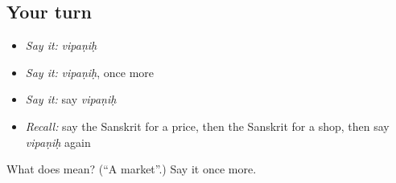 \subsection*{Your turn}
\begin{itemize}
\raggedright
  \item \emph{Say it:} \emph{vipaṇiḥ}
  \item \emph{Say it:} \emph{vipaṇiḥ}, once more
  \item \emph{Say it:} say \emph{vipaṇiḥ}
  \item \emph{Recall:} say the Sanskrit for a price, then the Sanskrit for a shop, then say \emph{vipaṇiḥ} again
\end{itemize}

\begin{tcolorbox}[breakable,colback=teal!4,colframe=teal!35!black,title={Before you move on}]
What does  mean? (\textquotedblleft{}A market\textquotedblright{}.) Say it once more.
\end{tcolorbox}
